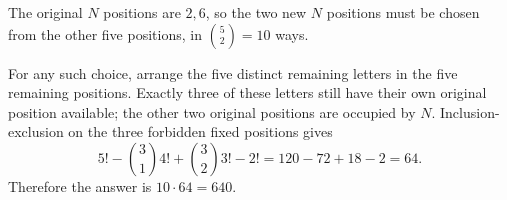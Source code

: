 The original $N$ positions are $2,6$, so the two new $N$ positions must be chosen from the other five positions, in $\binom52=10$ ways.

For any such choice, arrange the five distinct remaining letters in the five remaining positions. Exactly three of these letters still have their own original position available; the other two original positions are occupied by $N$. Inclusion-exclusion on the three forbidden fixed positions gives
\[
5!-\binom31 4!+\binom32 3!-2!=120-72+18-2=64.
\]
Therefore the answer is $\boxed{10\cdot64=640}$.
